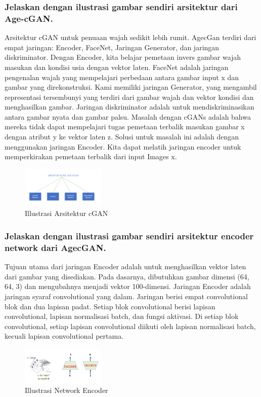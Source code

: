 \subsubsection{Jelaskan dengan ilustrasi gambar sendiri arsitektur dari Age-cGAN.}
\hfill \break
Arsitektur cGAN untuk penuaan wajah sedikit lebih rumit. AgecGan terdiri dari empat jaringan: Encoder, FaceNet, Jaringan Generator, dan jaringan diskriminator. Dengan Encoder, kita belajar pemetaan invers gambar wajah masukan dan kondisi usia dengan vektor laten. FaceNet adalah jaringan pengenalan wajah yang mempelajari perbedaan antara gambar input x dan gambar yang direkonstruksi. Kami memiliki jaringan Generator, yang mengambil representasi tersembunyi yang terdiri dari gambar wajah dan vektor kondisi dan menghasilkan gambar. Jaringan diskriminator adalah untuk mendiskriminasikan antara gambar nyata dan gambar palsu. Masalah dengan cGANs adalah bahwa mereka tidak dapat mempelajari tugas pemetaan terbalik masukan gambar x dengan atribut y ke vektor laten z. Solusi untuk masalah ini adalah dengan menggunakan jaringan Encoder. Kita dapat melatih jaringan encoder untuk memperkirakan pemetaan terbalik dari input Images x. 
	\begin{figure}[H]
    	\includegraphics[width=4cm]{figures/1174057/chapter9/2.PNG}
    	\centering
    	\caption{Illustrasi Arsitektur cGAN}
	\end{figure}

\subsubsection{Jelaskan dengan ilustrasi gambar sendiri arsitektur encoder network dari AgecGAN.}
\hfill \break
Tujuan utama dari jaringan Encoder adalah untuk menghasilkan vektor laten dari gambar yang disediakan. Pada dasarnya, dibutuhkan gambar dimensi (64, 64, 3) dan mengubahnya menjadi vektor 100-dimensi. Jaringan Encoder adalah jaringan syaraf convolutional yang dalam. Jaringan berisi empat convolutional blok dan dua lapisan padat. Setiap blok convolutional berisi lapisan convolutional, lapisan normalisasi batch, dan fungsi aktivasi. Di setiap blok convolutional, setiap lapisan convolutional diikuti oleh lapisan normalisasi batch, kecuali lapisan convolutional pertama. 
	\begin{figure}[H]
		\includegraphics[width=4cm]{figures/1174057/chapter9/3.jpg}
		\centering
		\caption{Illustrasi Network Encoder}
	\end{figure}
	
